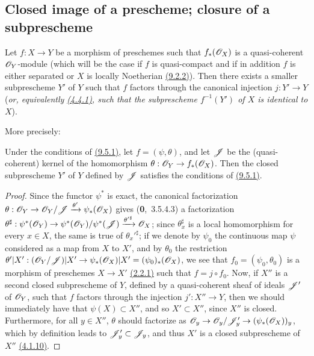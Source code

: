 \subsection{Closed image of a prescheme; closure of a subprescheme}
\label{subsection-closed-image-and-closure}

\begin{prop}[9.5.1]
\label{prop-1.9.5.1}
Let $f:X\to Y$ be a morphism of preschemes such that $f_*(\mathscr{O}_X)$ is a quasi-coherent
$\mathscr{O}_Y$-module (which will be the case if $f$ is quasi-compact and if in addition $f$ is
either separated or $X$ is locally Noetherian \hyperref[cor-1.9.2.2]{(9.2.2)}). Then there exists a smaller
subprescheme $Y'$ of $Y$ such that $f$ factors through the canonical injection $j:Y'\to Y$
({\em or, equivalently \hyperref[prop-1.4.4.1]{(4.4.1)}, such that the subprescheme $f^{-1}(Y')$ of $X$ is
{\em identical} to $X$}).
\end{prop}

More precisely:
\begin{cor}[9.5.2]
\label{cor-1.9.5.2}
Under the conditions of \hyperref[prop-1.9.5.1]{(9.5.1)}, let $f=(\psi,\theta)$, and let $\mathscr{J}$ be the
(quasi-coherent) kernel of the homomorphism $\theta:\mathscr{O}_Y\to f_*(\mathscr{O}_X)$. Then the closed
subprescheme $Y'$ of $Y$ defined by $\mathscr{J}$ satisfies the conditions of \hyperref[prop-1.9.5.1]{(9.5.1)}.
\end{cor}

\begin{proof}
\label{proof-cor-1.9.5.2}
Since the functor $\psi^*$ is exact, the canonical factorization
$\theta:\mathscr{O}_Y\to\mathscr{O}_Y/\mathscr{J}\xrightarrow{\theta'}\psi_*(\mathscr{O}_X)$ gives (\textbf{0},~3.5.4.3)
a factorization
$\theta^\sharp:\psi^*(\mathscr{O}_Y)\to\psi^*(\mathscr{O}_Y)/\psi^*(\mathscr{J})
  \xrightarrow{{\theta'}^\sharp}\mathscr{O}_X$; since $\theta_x^\sharp$ is a local homomorphism for
every $x\in X$, the same is true of ${\theta_x'}^\sharp$; if we denote by $\psi_0$ the
continuous map $\psi$ considered as a map from $X$ to $X'$, and by $\theta_0$ the restriction
$\theta'|X':(\mathscr{O}_Y/\mathscr{J})|X'\to\psi_*(\mathscr{O}_X)|X'=(\psi_0)_*(\mathscr{O}_X)$, we see that
$f_0=(\psi_0,\theta_0)$ is a morphism of preschemes $X\to X'$ \hyperref[defn-1.2.2.1]{(2.2.1)} such that
$f=j\circ f_0$. Now, if $X''$ is
a second closed subprescheme of $Y$, defined by a quasi-coherent sheaf of ideals $\mathscr{J}'$ of
$\mathscr{O}_Y$, such that $f$ factors through the injection $j':X''\to Y$, then we should
immediately have that $\psi(X)\subset X''$, and so $X'\subset X''$, since $X''$ is closed.
Furthermore, for all $y\in X''$, $\theta$ should factorize as
$\mathscr{O}_y\to\mathscr{O}_y/\mathscr{J}'_y\to(\psi_*(\mathscr{O}_X))_y$, which by definition leads to
$\mathscr{J}'_y\subset\mathscr{J}_y$, and thus $X'$ is a closed subprescheme of $X''$
\hyperref[cor-1.4.1.10]{(4.1.10)}.
\end{proof}

